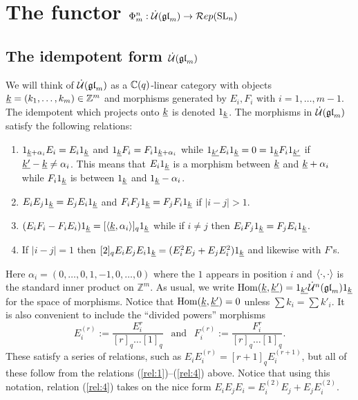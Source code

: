 \documentclass[10pt,leqno]{article}
\begin{document}
\section{The functor $\Phi_m^n:\dot{{\mathcal{U}}}({\mathfrak{gl}}_m) \rightarrow \mathcal{R}ep({\rm{SL}}_n)$}\label{sec:phi}

\subsection{The idempotent form $\dot{{\mathcal{U}}}({\mathfrak{gl}}_m)$}\label{sec:idemform}

We will think of $\dot{{\mathcal{U}}}({\mathfrak{gl}}_m)$ as a ${\mathbb{C}}(q)$-linear category with objects $ {\underline{k}} = (k_1, \dots, k_m) \in \mathbb Z^m $ and morphisms generated by $ E_i, F_i$ with $i=1, \dots, m-1$. The idempotent which projects onto ${\underline{k}}$ is denoted $1_{\underline{k}}$. The morphisms in $\dot{{\mathcal{U}}}({\mathfrak{gl}}_m)$ satisfy the following relations:
\begin{enumerate}
\item\label{rel:1} $1_{{\underline{k}}+\alpha_i} E_i = E_i 1_{{\underline{k}}}$ and $1_{{\underline{k}}} F_i = F_i 1_{{\underline{k}}+\alpha_i}$ while $1_{{\underline{k'}}} E_i 1_{{\underline{k}}} = 0 = 1_{{\underline{k}}} F_i 1_{{\underline{k'}}}$ if ${\underline{k'}}-{\underline{k}} \ne \alpha_i$. This means that $E_i 1_{{\underline{k}}}$ is a morphism between ${\underline{k}}$ and ${\underline{k}} + \alpha_i$ while $F_i 1_{{\underline{k}}}$ is between $1_{{\underline{k}}}$ and $1_{{\underline{k}}} - \alpha_i$. 
\item\label{rel:2} $E_iE_j 1_{{\underline{k}}} = E_jE_i 1_{{\underline{k}}}$ and $F_iF_j 1_{{\underline{k}}} = F_jF_i 1_{{\underline{k}}}$ if $|i-j|>1$. 
\item\label{rel:3} $(E_iF_i - F_iE_i) 1_{{\underline{k}}} = [\langle {\underline{k}}, \alpha_i \rangle]_q 1_{{\underline{k}}}$ while if $i \ne j$ then $E_iF_j 1_{{\underline{k}}} = F_jE_i 1_{{\underline{k}}}$. 
\item\label{rel:4} If $|i-j|=1$ then $[2]_q E_iE_jE_i 1_{{\underline{k}}} = (E_i^2 E_j + E_j E_i^2) 1_{{\underline{k}}}$ and likewise with $F$'s. 
\end{enumerate}
Here $\alpha_i = (0,\dots,0,1,-1,0,\dots,0)$ where the $1$ appears in position $i$ and $\langle \cdot, \cdot \rangle$ is the standard inner product on $\mathbb Z^m$. As usual, we write $\operatorname{Hom}({\underline{k}}, {\underline{k'}}) = 1_{\underline{k'}} \dot{{\mathcal{U}}}^n({\mathfrak{gl}}_m) 1_{\underline{k}}$ for the space of morphisms. Notice that $\operatorname{Hom}({\underline{k}}, {\underline{k'}}) = 0 $ unless $\sum k_i = \sum k'_i$. It is also convenient to include the ``divided powers'' morphisms 
$$E_i^{(r)} := \frac{E_i^r}{[r]_q \dots [1]_q} \ \ \text{ and } \ \ F_i^{(r)} := \frac{F_i^r}{[r]_q \dots [1]_q}.$$
These satisfy a series of relations, such as $E_i E_i^{(r)} = [r+1]_q E_i^{(r+1)}$, but all of these follow from the relations (\ref{rel:1})--(\ref{rel:4}) above. Notice that using this notation, relation (\ref{rel:4}) takes on the nice form $E_iE_jE_i = E_i^{(2)}E_j + E_jE_i^{(2)}$. 
\end{document}
